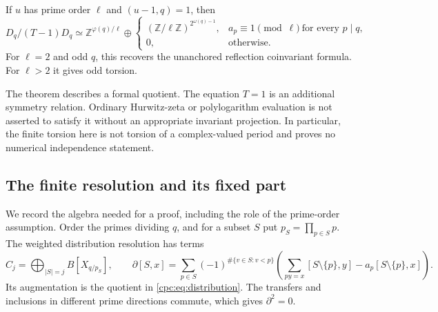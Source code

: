 \begin{corollary}
\label{cpc:cor:fixedfree}
If $u$ has prime order $\ell$ and $(u-1,q)=1$, then
\[
 D_q/(T-1)D_q\simeq
 \mathbb Z^{\varphi(q)/\ell}\oplus
 \begin{cases}
 (\mathbb Z/\ell\mathbb Z)^{2^{\omega(q)-1}},
       &a_p\equiv1\pmod\ell\ \text{for every }p\mid q,\\
 0,&\text{otherwise}.
 \end{cases}
\]
For $\ell=2$ and odd $q$, this recovers the unanchored reflection
coinvariant formula. For $\ell>2$ it gives odd torsion.
\end{corollary}

The theorem describes a formal quotient. The equation $T=1$ is an
additional symmetry relation. Ordinary Hurwitz-zeta or polylogarithm
evaluation is not asserted to satisfy it without an appropriate
invariant projection. In particular, the finite torsion here is not
torsion of a complex-valued period and proves no numerical independence
statement.

\subsection{The finite resolution and its fixed part}

We record the algebra needed for a proof, including the role of the
prime-order assumption. Order the primes dividing $q$, and for a
subset $S$ put $p_S=\prod_{p\in S}p$. The weighted distribution
resolution has terms
\begin{equation}\label{cpc:eq:resolution}
 C_j=\bigoplus_{|S|=j}B[X_{q/p_S}],
 \qquad
 \partial[S,x]=\sum_{p\in S}(-1)^{\#\{v\in S:v<p\}}
 \left(\sum_{py=x}[S\setminus\{p\},y]
            -a_p[S\setminus\{p\},x]\right).
\end{equation}
Its augmentation is the quotient in \eqref{cpc:eq:distribution}.
The transfers and inclusions in different prime directions commute,
which gives $\partial^2=0$.

